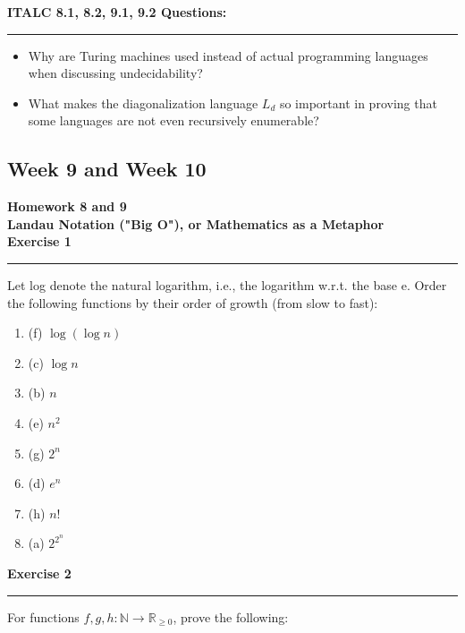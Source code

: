 \documentclass{article}
\theoremstyle{theorem}
\theoremstyle{definition}
\theoremstyle{remark}
\begin{document}
\textbf{ITALC 8.1, 8.2, 9.1, 9.2 Questions:}
\vspace{0.5em}
\hrule
\vspace{0.5em}
\begin{itemize}
  \item Why are Turing machines used instead of actual programming languages when discussing undecidability?
  \item What makes the diagonalization language \( L_d \) so important in proving that some languages are not even recursively enumerable?
\end{itemize}


\subsection{Week 9 and Week 10}
\textbf{Homework 8 and 9}\\
\textbf {Landau Notation ("Big O"), or Mathematics as a Metaphor}\\
\textbf{Exercise 1} \\
\vspace{0.5em}
\hrule
\vspace{0.5em}
Let log denote the natural logarithm, i.e., the logarithm w.r.t. the base e. Order the following functions by their order of growth (from slow to fast):
\begin{enumerate}
  \item (f) \(\log(\log n)\)
  \item (c) \(\log n\)
  \item (b) \(n\)
  \item (e) \(n^2\)
  \item (g) \(2^n\)
  \item (d) \(e^n\)
  \item (h) \(n!\)
  \item (a) \(2^{2^n}\)
\end{enumerate}

\textbf{Exercise 2}
\vspace{0.5em}
\hrule
\vspace{0.5em}
For functions \( f, g, h \colon \mathbb{N} \to \mathbb{R}_{\geq 0} \), prove the following:
\end{document}
